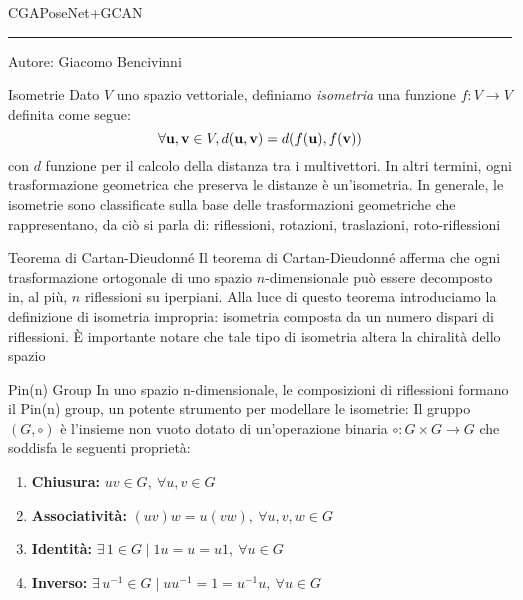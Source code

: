 \begin{frame}
    \Huge CGAPoseNet+GCAN
    \rule{\textwidth}{.25pt}
    \small{Autore: Giacomo Bencivinni}
\end{frame}
\begin{frame}{Isometrie}
    Dato \(V\) uno spazio vettoriale, 
    definiamo \emph{isometria} una funzione \(f \colon V \to V\) definita come segue:
    \[
        \forall \mathbf{u}, \mathbf{v} \in V, d(\mathbf{u}, \mathbf{v}) = d(f(\mathbf{u}), f(\mathbf{v}))
    \]
    con \(d\) funzione per il calcolo della distanza tra i multivettori.
    In altri termini, ogni trasformazione geometrica che preserva le distanze
    è un'isometria. In generale,
    le isometrie sono classificate sulla base delle trasformazioni geometriche che rappresentano,
    da ciò si parla di: riflessioni, rotazioni, traslazioni, roto-riflessioni
\end{frame}

\begin{frame}{Teorema di Cartan-Dieudonné}
   Il teorema di Cartan-Dieudonné afferma che ogni trasformazione ortogonale
   di uno spazio \(n\)-dimensionale può essere decomposto in, al più, 
   \(n\) riflessioni su iperpiani.
   Alla luce di questo teorema introduciamo la definizione di isometria impropria: 
   isometria composta da un numero dispari di riflessioni. 
   È importante notare che tale tipo di isometria altera la chiralità dello spazio
\end{frame}

\begin{frame}{Pin(n) Group}
   In uno spazio n-dimensionale, le composizioni di riflessioni formano il Pin(n) group, un potente strumento per modellare le isometrie:
   Il gruppo \((G, \circ)\) è l’insieme non vuoto dotato di un'operazione binaria \(\circ : G \times G \to G\) che soddisfa le seguenti proprietà:
   
   \begin{enumerate}
      \item \textbf{Chiusura:} \( uv \in G, \ \forall u, v \in G \)
      \item \textbf{Associatività:} \( (uv)w = u(vw), \ \forall u, v, w \in G \)
      \item \textbf{Identità:} \( \exists \, 1 \in G \mid 1u = u = u1, \ \forall u \in G \)
      \item \textbf{Inverso:} \( \exists \, u^{-1} \in G \mid uu^{-1} = 1 = u^{-1}u, \ \forall u \in G \)
    \end{enumerate}
\end{frame}

